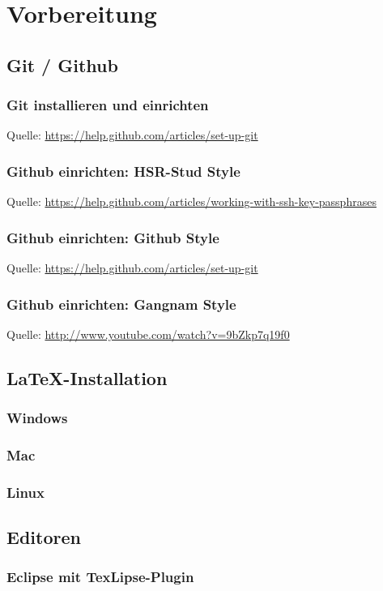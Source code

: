 \section{Vorbereitung}

\subsection{Git / Github}
\subsubsection{Git installieren und einrichten}
Quelle: \url{https://help.github.com/articles/set-up-git}
\subsubsection{Github einrichten: HSR-Stud Style}
Quelle: \url{https://help.github.com/articles/working-with-ssh-key-passphrases}
\subsubsection{Github einrichten: Github Style}
Quelle: \url{https://help.github.com/articles/set-up-git}
\subsubsection{Github einrichten: Gangnam Style}
Quelle: \url{http://www.youtube.com/watch?v=9bZkp7q19f0}

\subsection{\LaTeX-Installation}
\subsubsection{Windows}
\subsubsection{Mac}
\subsubsection{Linux}


\subsection{Editoren}
\subsubsection{Eclipse mit TexLipse-Plugin}

